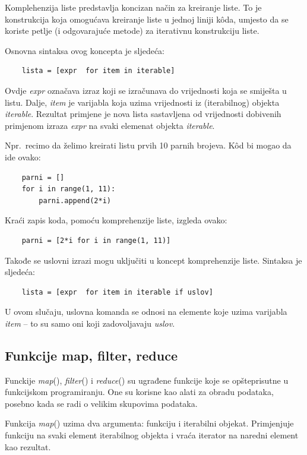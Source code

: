 Komplehenzija liste predstavlja koncizan način za kreiranje liste. To je konstrukcija koja omogućava kreiranje liste u jednoj liniji k\^oda, umjesto da se koriste petlje (i odgovarajuće metode) za iterativnu konstrukciju liste.

Osnovna sintaksa ovog koncepta je sljedeća:

\begin{verbatim}
	lista = [expr  for item in iterable]
\end{verbatim}
Ovdje \textit{expr} označava izraz koji se izračunava do vrijednosti koja se smiješta u listu.
Dalje, \textit{item} je varijabla koja  uzima vrijednosti iz (iterabilnog) objekta \textit{iterable}.  Rezultat primjene je nova lista sastavljena od  vrijednosti dobivenih primjenom izraza  \textit{expr} na svaki elemenat objekta \textit{iterable}.

Npr.\ recimo da želimo kreirati listu prvih 10 parnih brojeva. K\^od bi mogao da ide ovako:

\begin{verbatim}
	parni = []
	for i in range(1, 11):
	    parni.append(2*i)
\end{verbatim}

Kraći zapis koda, pomoću komprehenzije liste, izgleda ovako:


\begin{verbatim}
	parni = [2*i for i in range(1, 11)]
\end{verbatim}
Takođe se  uslovni izrazi  mogu uključiti u koncept komprehenzije liste. Sintaksa je sljedeća:

\begin{verbatim}
	lista = [expr  for item in iterable if uslov]
\end{verbatim}
U ovom slučaju, uslovna komanda se odnosi na elemente koje uzima varijabla \textit{item} -- to su samo oni koji zadovoljavaju \textit{uslov}. 

\subsection{Funkcije map, filter, reduce}

Funckije \textit{map}(), \textit{filter}() i \textit{reduce}() su ugrađene funkcije koje se opšteprisutne u funkcijskom programiranju. One su korisne kao alati za obradu podataka, posebno kada se radi o velikim skupovima podataka.

Funkcija \textit{map}() uzima dva argumenta: funkciju i iterabilni objekat. Primjenjuje funkciju  na svaki element iterabilnog objekta i vraća iterator na naredni element kao rezultat. 

